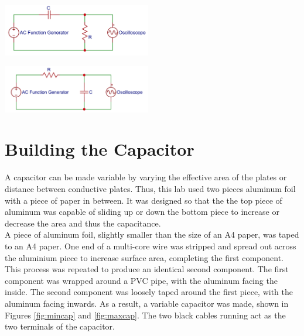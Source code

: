 \documentclass[journal]{IEEEtran}
\begin{document}
\begingroup
    \centering
    \includegraphics[width=245]{images/lab4_6.png}
    \label{fig:HPF}
\endgroup

\begingroup
    \centering
    \includegraphics[width=245]{images/lab4_5.png}
    \label{fig:LPF}
\endgroup

\section{Building the Capacitor}

\noindent A capacitor can be made variable by varying the effective area of the plates or distance between conductive plates. Thus, this lab used two pieces aluminum foil with a piece of paper in between. It was designed so that the the top piece of aluminum was capable of sliding up or down the bottom piece to increase or decrease the area and thus the capacitance. \\

\noindent A piece of aluminum foil, slightly smaller than the size of an A4 paper, was taped to an A4 paper. One end of a multi-core wire was stripped and spread out across the aluminium piece to increase surface area, completing the first component. This process was repeated to produce an identical second component. The first component was wrapped around a PVC pipe, with the aluminum facing the inside. The second component was loosely taped around the first piece, with the aluminum facing inwards. As a result, a variable capacitor was made, shown in Figures \ref{fig:mincap} and \ref{fig:maxcap}. The two black cables running act as the two terminals of the capacitor.
\end{document}
